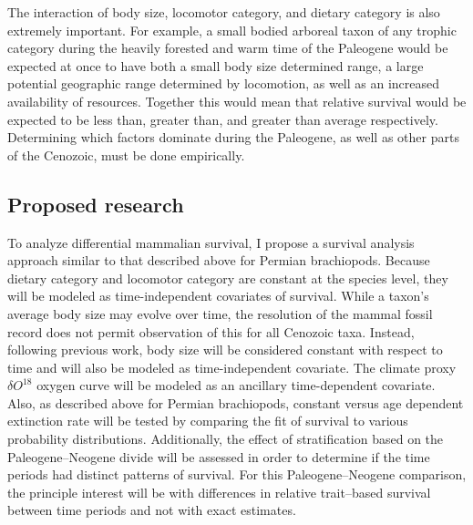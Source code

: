 \documentclass[12pt,letterpaper]{article}
\begin{document}
The interaction of body size, locomotor category, and dietary category is also extremely important. For example, a small bodied arboreal taxon of any trophic category during the heavily forested and warm time of the Paleogene would be expected at once to have both a small body size determined range, a large potential geographic range determined by locomotion, as well as an increased availability of resources. Together this would mean that relative survival would be expected to be less than, greater than, and greater than average respectively. Determining which factors dominate during the Paleogene, as well as other parts of the Cenozoic, must be done empirically.


\subsection{Proposed research}
To analyze differential mammalian survival, I propose a survival analysis approach similar to that described above for Permian brachiopods. Because dietary category and locomotor category are constant at the species level, they will be modeled as time-independent covariates of survival. While a taxon's average body size may evolve over time, the resolution of the mammal fossil record does not permit observation of this for all Cenozoic taxa. Instead, following previous work, body size will be considered constant with respect to time and will also be modeled as time-independent covariate. The climate proxy \(\delta O^{18}\) oxygen curve \citep{Zachos2008} will be modeled as an ancillary time-dependent covariate. Also, as described above for Permian brachiopods, constant versus age dependent extinction rate will be tested by comparing the fit of survival to various probability distributions. Additionally, the effect of stratification based on the Paleogene--Neogene divide will be assessed in order to determine if the time periods had distinct patterns of survival. For this Paleogene--Neogene comparison, the principle interest will be with differences in relative trait--based survival between time periods and not with exact estimates.
\end{document}
